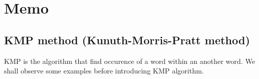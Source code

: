 \section{Memo}\label{sec:memorandom}
\newcommand{\rmapr}{M_{\mybf{R}}\mybf{R}}
\newcommand{\nmapr}{M_{\mybf{R}}\mybf{N}}
\newcommand{\zmapr}{M_{\mybf{R}}\mybf{Z}}
\newcommand{\loner}{L\mybf{R}}
\newcommand{\intallr}[1]{\int_{{#1}\in\mybf{R}}}

\newcommand{\sgraph}{\entrymodifiers={++[o][F-]}\xymatrix@R=1pt@C-1pc}

\subsection{KMP method (Kunuth-Morris-Pratt method)}
KMP is the algorithm that find occurence of a word within an another word.
We shall observe some examples before introducing KMP algorithm.

